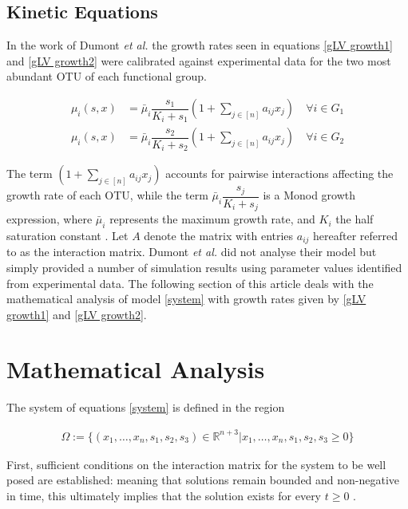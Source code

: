 \documentclass[3p,times]{article}
\newcommand{\R}{\mathbb{R}}
\begin{document}
\subsection{Kinetic Equations}
In the work of Dumont \textit{et al.} \cite{Dumont2016} the growth rates seen in equations \eqref{gLV growth1} and \eqref{gLV growth2} were calibrated against experimental data for the two most abundant OTU of each functional group.

\begin{align}
\label{gLV growth1}\mu_i(s,x) &= \bar{\mu}_i \dfrac{s_1}{K_i + s_1}\left(1+\sum \limits_{j\in [n]} a_{ij} x_{j} \right) \quad \forall i \in G_1 \\
\label{gLV growth2}\mu_i(s,x) &= \bar{\mu}_i \dfrac{s_2}{K_i + s_2}\left(1+\sum \limits_{j\in [n]} a_{ij} x_{j} \right) \quad \forall i \in G_2 
\end{align}

The term $\left(1+\sum \limits_{j\in [n]} a_{ij} x_{j} \right)$ accounts for pairwise interactions affecting the growth rate of each OTU, while the term $\bar{\mu}_i\dfrac{s_j}{K_i + s_j}$ is a Monod growth expression, where $\bar{\mu}_i$ represents the maximum growth rate, and $K_i$ the half saturation constant \cite{monod1942recherches}. Let $A$ denote the matrix
with entries $a_{ij}$ hereafter referred to as the interaction matrix. Dumont\textit{ et al.} did not analyse their model but simply provided a number of simulation results using parameter values identified from experimental data. The following section of this article deals with the mathematical analysis of model \eqref{system} with growth rates given by \eqref{gLV growth1} and \eqref{gLV growth2}.

\section{Mathematical Analysis}

The system of equations \eqref{system} is defined in the region 

\begin{align*}
\Omega := \{ (x_1,\dots,x_n,s_1,s_2,s_3)\in  \R^{n+3} | x_1,\dots,x_n,s_1,s_2,s_3  \geq 0  \}
\end{align*}

First, sufficient conditions on the interaction matrix for the system to be well posed are established: meaning that solutions remain bounded and non-negative in time, this ultimately implies that the solution exists for every $t \geq 0$ \cite{Khalil1996}. 
\end{document}
